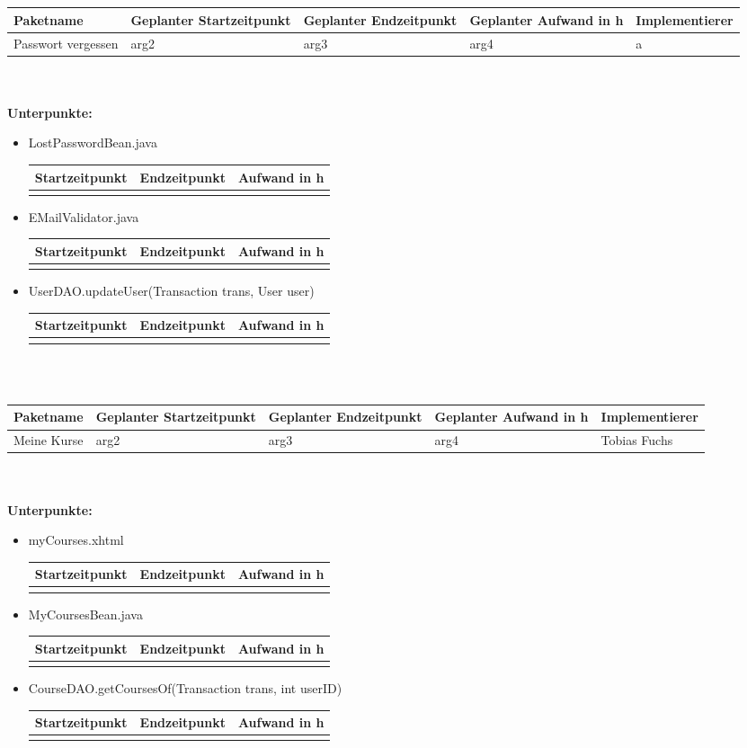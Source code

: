 \documentclass[12pt,a4paper]{scrreprt}
\newcommand{\Arbeitspaket}[5]{	\begin{tabular}{|p{4cm}|p{3cm}|p{3cm}|p{3cm}|p{3cm}|}
		\hline \textbf{Paketname} & \textbf{Geplanter Startzeitpunkt} & \textbf{Geplanter Endzeitpunkt} & \textbf{Geplanter Aufwand in h} & \textbf{Implementierer} \\ 
		\hline #1 & #2  & #3 & #4 & #5 \\ 
		\hline 
	\end{tabular} \ \\
	\ \\}
\begin{document}
	
	\ \\	
	\ \\
	\Arbeitspaket{Passwort vergessen}{arg2}{arg3}{arg4}{a}
	\textbf{Unterpunkte:}
	\begin{itemize}
		\item LostPasswordBean.java	\\
		\begin{tabular}{|p{4cm}|p{4cm}|p{4cm}|}
			\hline Startzeitpunkt & Endzeitpunkt & Aufwand in h \\ 
			\hline &      &  \\ 
			\hline 
		\end{tabular}
		\item EMailValidator.java\\
		\begin{tabular}{|p{4cm}|p{4cm}|p{4cm}|}
			\hline Startzeitpunkt & Endzeitpunkt & Aufwand in h \\ 
			\hline &      &  \\ 
			\hline 
		\end{tabular}
		\item UserDAO.updateUser(Transaction trans, User user)\\
		\begin{tabular}{|p{4cm}|p{4cm}|p{4cm}|}
			\hline Startzeitpunkt & Endzeitpunkt & Aufwand in h \\ 
			\hline &      &  \\ 
			\hline 
		\end{tabular}
	\end{itemize}
		
		
   	\ \\
   	\ \\
   	\Arbeitspaket{Meine Kurse}{arg2}{arg3}{arg4}{Tobias Fuchs}
   	\textbf{Unterpunkte:}
	   	\begin{itemize}
    		\item myCourses.xhtml\\
    		\begin{tabular}{|p{4cm}|p{4cm}|p{4cm}|}
    			\hline Startzeitpunkt & Endzeitpunkt & Aufwand in h \\ 
    			\hline &      &  \\ 
    			\hline 
    		\end{tabular}	
    		\item MyCoursesBean.java\\
    		\begin{tabular}{|p{4cm}|p{4cm}|p{4cm}|}
    			\hline Startzeitpunkt & Endzeitpunkt & Aufwand in h \\ 
    			\hline &      &  \\ 
    			\hline 
    		\end{tabular}
    		\item CourseDAO.getCoursesOf(Transaction trans, int userID)\\
    		\begin{tabular}{|p{4cm}|p{4cm}|p{4cm}|}
    			\hline Startzeitpunkt & Endzeitpunkt & Aufwand in h \\ 
    			\hline &      &  \\ 
    			\hline 
    		\end{tabular}
    	\end{itemize}
	
\end{document}
